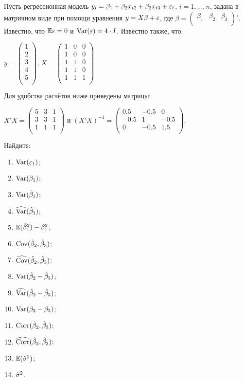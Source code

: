 \begin{problem}
Пусть регрессионная модель $y_i = \beta_1 + \beta_2 x_{i2} + \beta_3 x_{i3} + \varepsilon_i$, $i = 1, \ldots, n$, задана в матричном виде при помощи уравнения $y = X \beta + \varepsilon$, где $\beta =  \begin{pmatrix}
\beta_1 & \beta_2 & \beta_3\\
\end{pmatrix} '$. Известно, что $\mathbb{E} \varepsilon = 0$ и $\operatorname{Var} (\varepsilon) = 4 \cdot I$. Известно также, что:

$y =  \begin{pmatrix}
1 \\
2 \\
3 \\
4 \\
5 \\
\end{pmatrix} $, $X =  \begin{pmatrix}
1 & 0 & 0 \\
1 & 0 & 0 \\
1 & 1 & 0 \\
1 & 1 & 0 \\
1 & 1 & 1 \\
\end{pmatrix} $

Для удобства расчётов ниже приведены матрицы:

$X' X =  \begin{pmatrix}
5 & 3 & 1 \\
3 & 3 & 1 \\
1 & 1 & 1 \\
\end{pmatrix} $ и $(X' X)^{-1} =  \begin{pmatrix}
0.5 & -0.5 & 0 \\
-0.5 & 1 & -0.5 \\
0 & -0.5 & 1.5 \\
\end{pmatrix} $.

Найдите:
\begin{enumerate}
\item $\operatorname{Var} (\varepsilon_1)$;
\item $\operatorname{Var} (\beta_1)$;
\item $\operatorname{Var} (\hat{\beta}_1)$;
\item $\widehat{\operatorname{Var}}(\hat{\beta}_1)$;
\item $\mathbb{E} (\hat{\beta}_1^2) - \beta_1^2$;
\item $\operatorname{Cov} (\hat{\beta}_2, \hat{\beta}_3)$;
\item $\widehat{\operatorname{Cov}}(\hat{\beta}_2, \hat{\beta}_3)$;
\item $\operatorname{Var} (\hat{\beta}_2 - \hat{\beta}_3)$;
\item $\widehat{\operatorname{Var}}(\hat{\beta}_2 - \hat{\beta}_3)$;
\item $\operatorname{Var} (\beta_2 - \beta_3)$;
\item $\operatorname{Corr} (\hat{\beta}_2, \hat{\beta}_3)$;
\item $\widehat{\operatorname{Corr}}(\hat{\beta}_2, \hat{\beta}_3)$;
\item $\mathbb{E} (\hat{\sigma}^2)$;
\item $\hat{\sigma}^2$.
\end{enumerate}



\end{problem}
